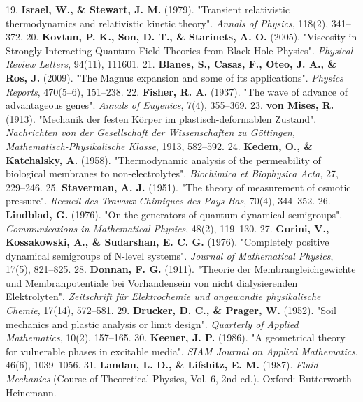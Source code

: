 \documentclass[11pt,a4paper]{article}
\theoremstyle{definition}
\theoremstyle{remark}
\begin{document}
19. \textbf{Israel, W., \& Stewart, J. M.} (1979). "Transient relativistic thermodynamics and relativistic kinetic theory". \textit{Annals of Physics}, 118(2), 341–372.
20. \textbf{Kovtun, P. K., Son, D. T., \& Starinets, A. O.} (2005). "Viscosity in Strongly Interacting Quantum Field Theories from Black Hole Physics". \textit{Physical Review Letters}, 94(11), 111601.
21. \textbf{Blanes, S., Casas, F., Oteo, J. A., \& Ros, J.} (2009). "The Magnus expansion and some of its applications". \textit{Physics Reports}, 470(5–6), 151–238.
22. \textbf{Fisher, R. A.} (1937). "The wave of advance of advantageous genes". \textit{Annals of Eugenics}, 7(4), 355–369.
23. \textbf{von Mises, R.} (1913). "Mechanik der festen Körper im plastisch-deformablen Zustand". \textit{Nachrichten von der Gesellschaft der Wissenschaften zu Göttingen, Mathematisch-Physikalische Klasse}, 1913, 582–592.
24. \textbf{Kedem, O., \& Katchalsky, A.} (1958). "Thermodynamic analysis of the permeability of biological membranes to non-electrolytes". \textit{Biochimica et Biophysica Acta}, 27, 229–246.
25. \textbf{Staverman, A. J.} (1951). "The theory of measurement of osmotic pressure". \textit{Recueil des Travaux Chimiques des Pays-Bas}, 70(4), 344–352.
26. \textbf{Lindblad, G.} (1976). "On the generators of quantum dynamical semigroups". \textit{Communications in Mathematical Physics}, 48(2), 119–130.
27. \textbf{Gorini, V., Kossakowski, A., \& Sudarshan, E. C. G.} (1976). "Completely positive dynamical semigroups of N-level systems". \textit{Journal of Mathematical Physics}, 17(5), 821–825.
28. \textbf{Donnan, F. G.} (1911). "Theorie der Membrangleichgewichte und Membranpotentiale bei Vorhandensein von nicht dialysierenden Elektrolyten". \textit{Zeitschrift für Elektrochemie und angewandte physikalische Chemie}, 17(14), 572–581.
29. \textbf{Drucker, D. C., \& Prager, W.} (1952). "Soil mechanics and plastic analysis or limit design". \textit{Quarterly of Applied Mathematics}, 10(2), 157–165.
30. \textbf{Keener, J. P.} (1986). "A geometrical theory for vulnerable phases in excitable media". \textit{SIAM Journal on Applied Mathematics}, 46(6), 1039–1056.
31. \textbf{Landau, L. D., \& Lifshitz, E. M.} (1987). \textit{Fluid Mechanics} (Course of Theoretical Physics, Vol. 6, 2nd ed.). Oxford: Butterworth-Heinemann.
\end{document}
